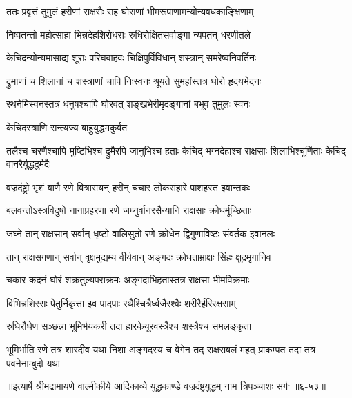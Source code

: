 \twolineshloka
{ततः प्रवृत्तं तुमुलं हरीणां राक्षसैः सह}
{घोराणां भीमरूपाणामन्योन्यवधकाङ्क्षिणाम्} %

\twolineshloka
{निष्पतन्तो महोत्साहा भिन्नदेहशिरोधराः}
{रुधिरोक्षितसर्वाङ्गा न्यपतन् धरणीतले} %

\twolineshloka
{केचिदन्योन्यमासाद्य शूराः परिघबाहवः}
{चिक्षिपुर्विविधान् शस्त्रान् समरेष्वनिवर्तिनः} %

\twolineshloka
{द्रुमाणां च शिलानां च शस्त्राणां चापि निःस्वनः}
{श्रूयते सुमहांस्तत्र घोरो हृदयभेदनः} %

\twolineshloka
{रथनेमिस्वनस्तत्र धनुषश्चापि घोरवत्}
{शङ्खभेरीमृदङ्गानां बभूव तुमुलः स्वनः} %

\onelineshloka
{केचिदस्त्राणि सन्त्यज्य बाहुयुद्धमकुर्वत} %

\threelineshloka
{तलैश्च चरणैश्चापि मुष्टिभिश्च द्रुमैरपि}
{जानुभिश्च हताः केचिद् भग्नदेहाश्च राक्षसाः}
{शिलाभिश्चूर्णिताः केचिद् वानरैर्युद्धदुर्मदैः} %

\twolineshloka
{वज्रदंष्ट्रो भृशं बाणै रणे वित्रासयन् हरीन्}
{चचार लोकसंहारे पाशहस्त इवान्तकः} %

\twolineshloka
{बलवन्तोऽस्त्रविदुषो नानाप्रहरणा रणे}
{जघ्नुर्वानरसैन्यानि राक्षसाः क्रोधर्मूच्छिताः} %

\twolineshloka
{जघ्ने तान् राक्षसान् सर्वान् धृष्टो वालिसुतो रणे}
{क्रोधेन द्विगुणाविष्टः संवर्तक इवानलः} %

\twolineshloka
{तान् राक्षसगणान् सर्वान् वृक्षमुद्यम्य वीर्यवान्}
{अङ्गदः क्रोधताम्राक्षः सिंहः क्षुद्रमृगानिव} %

\twolineshloka
{चकार कदनं घोरं शक्रतुल्यपराक्रमः}
{अङ्गदाभिहतास्तत्र राक्षसा भीमविक्रमाः} %

\twolineshloka
{विभिन्नशिरसः पेतुर्निकृत्ता इव पादपाः}
{रथैश्चित्रैर्ध्वजैरश्वैः शरीरैर्हरिरक्षसाम्} %

\twolineshloka
{रुधिरौघेण सञ्छन्ना भूमिर्भयकरी तदा}
{हारकेयूरवस्त्रैश्च शस्त्रैश्च समलङ्कृता} %

\threelineshloka
{भूमिर्भाति रणे तत्र शारदीव यथा निशा}
{अङ्गदस्य च वेगेन तद् राक्षसबलं महत्}
{प्राकम्पत तदा तत्र पवनेनाम्बुदो यथा} %


॥इत्यार्षे श्रीमद्रामायणे वाल्मीकीये आदिकाव्ये युद्धकाण्डे वज्रदंष्ट्रयुद्धम् नाम त्रिपञ्चाशः सर्गः ॥६-५३॥
